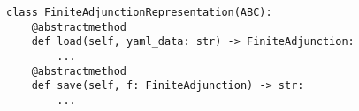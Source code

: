 \par\begin{minipage}{60ex}
\begin{verbatim}
class FiniteAdjunctionRepresentation(ABC):
    @abstractmethod
    def load(self, yaml_data: str) -> FiniteAdjunction:
        ...
    @abstractmethod
    def save(self, f: FiniteAdjunction) -> str:
        ...
\end{verbatim}
\end{minipage}\par